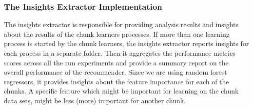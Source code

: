 \subsubsection*{The Insights Extractor Implementation}
\label{InsightsExtractorImplementation}
The insights extractor is responsible for providing analysis results and insights about the results of the chunk learners processes.
If more than one learning process is started by the chunk learners, the insights extractor reports insights for each process in a separate folder.
Then it aggregates the performance metrics scores across all the run experiments and provide a summary report on the overall performance of the recommender.
Since we are using random forest regressors, it provides insights about the feature importance for each of the chunks.
A specific feature which might be important for learning on the  chunk data sets, might be less (more) important for another chunk.